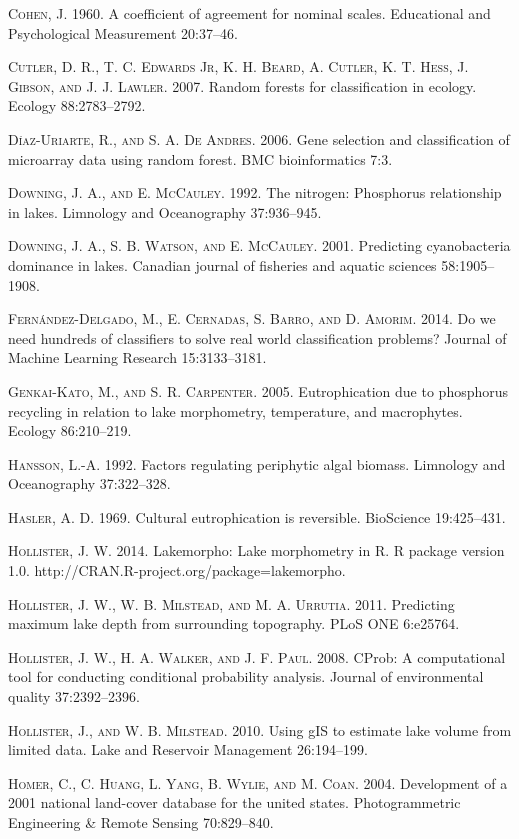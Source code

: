 \documentclass[11pt,]{article}
\begin{document}
\textsc{Cohen, J.} 1960. A coefficient of agreement for nominal scales.
Educational and Psychological Measurement 20:37--46.

\textsc{Cutler, D. R., T. C. Edwards Jr, K. H. Beard, A. Cutler, K. T.
Hess, J. Gibson, and J. J. Lawler}. 2007. Random forests for
classification in ecology. Ecology 88:2783--2792.

\textsc{D{í}az-Uriarte, R., and S. A. De Andres}. 2006. Gene selection
and classification of microarray data using random forest. BMC
bioinformatics 7:3.

\textsc{Downing, J. A., and E. McCauley}. 1992. The nitrogen: Phosphorus
relationship in lakes. Limnology and Oceanography 37:936--945.

\textsc{Downing, J. A., S. B. Watson, and E. McCauley}. 2001. Predicting
cyanobacteria dominance in lakes. Canadian journal of fisheries and
aquatic sciences 58:1905--1908.

\textsc{Fernández-Delgado, M., E. Cernadas, S. Barro, and D. Amorim}.
2014. Do we need hundreds of classifiers to solve real world
classification problems? Journal of Machine Learning Research
15:3133--3181.

\textsc{Genkai-Kato, M., and S. R. Carpenter}. 2005. Eutrophication due
to phosphorus recycling in relation to lake morphometry, temperature,
and macrophytes. Ecology 86:210--219.

\textsc{Hansson, L.-A.} 1992. Factors regulating periphytic algal
biomass. Limnology and Oceanography 37:322--328.

\textsc{Hasler, A. D.} 1969. Cultural eutrophication is reversible.
BioScience 19:425--431.

\textsc{Hollister, J. W.} 2014. Lakemorpho: Lake morphometry in R. R
package version 1.0. http://CRAN.R-project.org/package=lakemorpho.

\textsc{Hollister, J. W., W. B. Milstead, and M. A. Urrutia}. 2011.
Predicting maximum lake depth from surrounding topography. PLoS ONE
6:e25764.

\textsc{Hollister, J. W., H. A. Walker, and J. F. Paul}. 2008. CProb: A
computational tool for conducting conditional probability analysis.
Journal of environmental quality 37:2392--2396.

\textsc{Hollister, J., and W. B. Milstead}. 2010. Using gIS to estimate
lake volume from limited data. Lake and Reservoir Management
26:194--199.

\textsc{Homer, C., C. Huang, L. Yang, B. Wylie, and M. Coan}. 2004.
Development of a 2001 national land-cover database for the united
states. Photogrammetric Engineering \& Remote Sensing 70:829--840.
\end{document}
